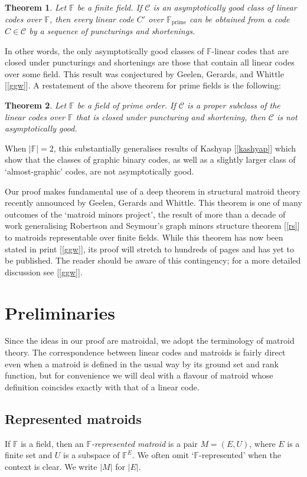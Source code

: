\documentclass[12pt]{amsart}
\newtheorem{theorem}{Theorem}[section]
\theoremstyle{definition}
\newcommand{\bF}{\mathbb F}
\newcommand{\cC}{\mathcal{C}}
\newcommand{\Fprime}{\mathbb{F}_{\mathrm{prime}}}
\begin{document}
  \begin{theorem}\label{main}
    Let $\bF$ be a finite field. If $\cC$ is an asymptotically good class of linear codes over $\bF$, then every linear code $C'$ over $\Fprime$ can be obtained from a code $C \in \cC$ by a sequence of puncturings and shortenings. 
  \end{theorem}
  
  In other words, the only asymptotically good classes of $\bF$-linear codes that are closed under puncturings and shortenings are those that contain all linear codes over some field. This result was conjectured by Geelen, Gerards, and Whittle [\ref{ggw}]. A restatement of the above theorem for prime fields is the following: 
\begin{theorem}
  Let $\bF$ be a field of prime order. If $\cC$ is a proper subclass of the linear codes over $\bF$ that is closed under puncturing and shortening, then $\cC$ is not asymptotically good. 
\end{theorem}
  When $|\bF| = 2$, this substantially generalises results of Kashyap [\ref{kashyap}] which show that the classes of graphic binary codes, as well as a slightly larger class of `almost-graphic' codes, are not asymptotically good.
  
  Our proof makes fundamental use of a deep theorem in structural matroid theory recently announced by Geelen, Gerards and Whittle. This theorem is one of many outcomes of the `matroid minors project', the result of more than a decade of work generalising Robertson and Seymour's graph minors structure theorem [\ref{rs}] to matroids representable over finite fields. While this theorem has now been stated in print [\ref{ggw}], its proof will stretch to hundreds of pages and has yet to be published. The reader should be aware of this contingency; for a more detailed discussion see [\ref{ggw}]. 
  
  
\section{Preliminaries}
  Since the ideas in our proof are matroidal, we adopt the terminology of matroid theory. The correspondence between linear codes and matroids is fairly direct even when a matroid is defined in the usual way by its ground set and rank function, but for convenience we will deal with a flavour of matroid whose definition coincides exactly with that of a linear code.
  
  \subsection*{Represented matroids} If $\bF$ is a field, then an \emph{$\bF$-represented matroid} is a pair $M = (E,U)$, where $E$ is a finite set and $U$ is a subspace of $\bF^E$. We often omit `$\bF$-represented' when the context is clear. We write $|M|$ for $|E|$.
  
\end{document}
